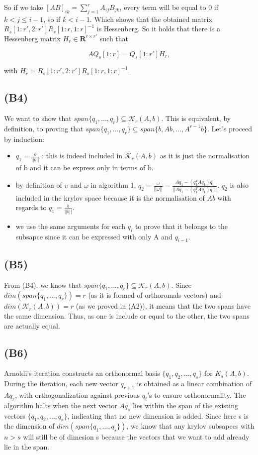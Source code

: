 \documentclass{article}
\begin{document}
So if we take \([AB]_{ik}=\sum_{j=1}^{r}A_{ij}B_{jk}\), every term will be equal to \(0\) if \(k<j\leq i-1\), so if \(k < i-1\). Which shows that the obtained matrix \(R_s[1:r', 2:r']R_s[1:r, 1:r]^{-1}\) is Hessenberg. So it holds that there is a Hessenberg matrix \(H_r\in \mathbf{R}^{r\times r'}\) such that

\[
A Q_s[1:r]  = Q_s[1:r'] H_r,
\]

with \(H_r=R_s[1:r', 2:r']R_s[1:r, 1:r]^{-1}\).


\subsection*{(B4)}
We want to show that $span\{q_1, ... , q_r\} \subseteq \mathcal{K}_r(A,b)$. This is equivalent, by definition, 
to proving that  $span\{q_1, ... , q_r\} \subseteq span \{ b, Ab,..., A^{r-1}b\}$.
Let's proceed by induction: 
\begin{itemize}
    \item $q_1 = \frac{b}{||b||}$ : this is indeed included in $\mathcal{K}_r(A,b)$ as it is just the normalisation of b
    and it can be express only in terms of b. 
    \item by definition of $\upsilon$ and $ \omega$ in algorithm 1, 
    $q_2 = \frac{\omega}{||\omega||} = \frac{A q_1 - (q_1^T A q_1)q_1}{||A q_1 - (q_1^T A q_1)q_1||}$. $q_2$ is also included in the krylov space because it is the normalisation of $Ab$ with regards to $q_1 = \frac{b}{||b||}$. 
    \item we use the same arguments for each $q_i$ to prove that it belongs to the subsapce since it can be expressed with only A and $q_{i-1}$. 
\end{itemize}

\subsection*{(B5)}
From (B4), we know that $span\{q_1, ... , q_r\} \subseteq \mathcal{K}_r(A,b)$.
Since $dim(span\{q_1, ... , q_r\}) = r$ (as it is formed of orthoromals vectors)
and $dim(\mathcal{K}_r(A,b)) = r$ (as we proved in (A2)), it means that the two spans have the same dimension. 
Thus, as one is include or equal to the other, the two spans are actually equal. 

\subsection*{(B6)}


Arnoldi's iteration constructs an orthonormal basis $ \{ q_1, q_2, \dots, q_s \} $ 
for $ K_s(A, b) $. 
During the iteration, each new vector $ q_{r+1} $ is obtained as a linear combination of $ A q_r $, 
with orthogonalization against previous $ q_i $'s to ensure orthonormality. The algorithm halts when the next vector $ A q_s $ lies within the span of the existing vectors $ \{ q_1, q_2, \dots, q_s \} $, indicating that no new dimension is added.
Since here s is the dimension of $dim(span\{q_1, ... , q_s\})$, we know that any krylov subsapces with $n>s$ will still
be of dimesion s because the vectors that we want to add already lie in the span. 
\end{document}
